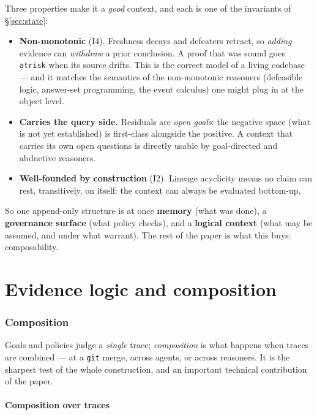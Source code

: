 \documentclass[11pt]{article}
\newcommand{\codeus}{\textunderscore\penalty100\relax}
\newcommand{\code}[1]{\texttt{\let\_\codeus #1}}
\begin{document}
Three properties make it a \emph{good} context, and each is one of the invariants of \S\ref{sec:state}:
\begin{itemize}
\item \textbf{Non-monotonic} (I4). Freshness decays and defeaters retract, so \emph{adding} evidence can
\emph{withdraw} a prior conclusion. A proof that was sound goes \code{at\_risk} when its source drifts. This
is the correct model of a living codebase --- and it matches the semantics of the non-monotonic reasoners
(defeasible logic, answer-set programming, the event calculus) one might plug in at the object level.
\item \textbf{Carries the query side.} Residuals are \emph{open goals}: the negative space (what is not yet
established) is first-class alongside the positive. A context that carries its own open questions is directly
usable by goal-directed and abductive reasoners.
\item \textbf{Well-founded by construction} (I2). Lineage acyclicity means no claim can rest, transitively,
on itself: the context can always be evaluated bottom-up.
\end{itemize}
So one append-only structure is at once \textbf{memory} (what was done), a \textbf{governance surface} (what
policy checks), and a \textbf{logical context} (what may be assumed, and under what warrant). The rest of
the paper is what this buys: composability.







\part{Evidence logic and composition}




\section{Composition}\label{sec:composition}

Goals and policies judge a \emph{single} trace; \emph{composition} is what happens when traces are combined
--- at a \code{git} merge, across agents, or across reasoners. It is the sharpest test of the whole
construction, and an important technical contribution of the paper.

\subsection{Composition over traces}\label{sec:merge}
\end{document}
